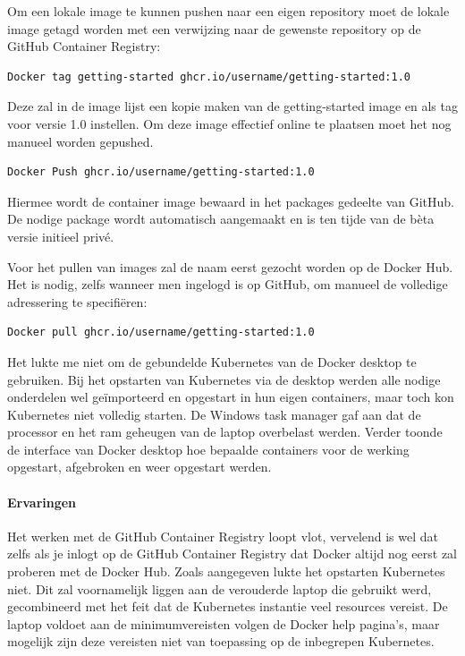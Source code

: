 Om een lokale image te kunnen pushen naar een eigen repository moet de lokale image getagd worden met een verwijzing naar de gewenste repository op de GitHub Container Registry:
\begin{verbatim}
Docker tag getting-started ghcr.io/username/getting-started:1.0
\end{verbatim}

Deze zal in de image lijst een kopie maken van de getting-started image en als tag voor versie 1.0 instellen. Om deze image effectief online te plaatsen moet het nog manueel worden gepushed.
\begin{verbatim}
Docker Push ghcr.io/username/getting-started:1.0
\end{verbatim}

Hiermee wordt de container image bewaard in het packages gedeelte van GitHub. De nodige package wordt automatisch aangemaakt en is ten tijde van de bèta versie initieel privé.

Voor het pullen van images zal de naam eerst gezocht worden op de Docker Hub. Het is nodig, zelfs wanneer men ingelogd is op GitHub, om manueel de volledige adressering te specifiëren:
\begin{verbatim}
Docker pull ghcr.io/username/getting-started:1.0
\end{verbatim}


Het lukte me niet om de gebundelde Kubernetes van de Docker desktop te gebruiken. Bij het opstarten van Kubernetes via de desktop werden alle nodige onderdelen wel geïmporteerd en opgestart in hun eigen containers, maar toch kon Kubernetes niet volledig starten. De Windows task manager gaf aan dat de processor en het ram geheugen van de laptop overbelast werden. Verder toonde de interface van Docker desktop hoe bepaalde containers voor de werking opgestart, afgebroken en weer opgestart werden.

\paragraph{Ervaringen}
Het werken met de GitHub Container Registry loopt vlot, vervelend is wel dat zelfs als je inlogt op de GitHub Container Registry dat Docker altijd nog eerst zal proberen met de Docker Hub.
Zoals aangegeven lukte het opstarten Kubernetes niet. Dit zal voornamelijk liggen aan de verouderde laptop die gebruikt werd, gecombineerd met het feit dat de Kubernetes instantie veel resources vereist. De laptop voldoet aan de minimumvereisten volgen de Docker help pagina’s, maar mogelijk zijn deze vereisten niet van toepassing op de inbegrepen Kubernetes.  


